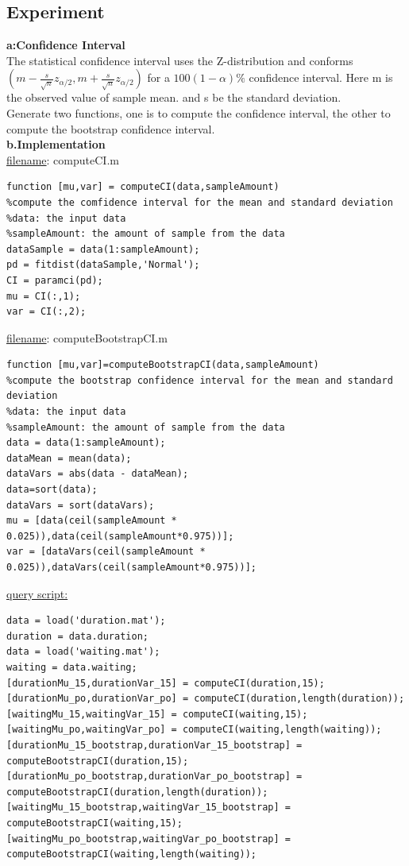 \documentclass[twoside]{article}
\begin{document}
\subsection{\normalsize{Experiment}}
\noindent \textbf {a:Confidence Interval}\\
The statistical confidence interval uses the Z-distribution and conforms $(m-\frac{s}{\sqrt{n}}z_{\alpha/2},m+\frac{s}{\sqrt{n}}z_{\alpha/2})$ for a $100(1-\alpha)\%$ confidence interval. Here m is the observed value of sample mean. and s be the standard deviation.\\
Generate two functions, one is to compute the confidence interval, the other to compute the bootstrap confidence interval. \\
\noindent \textbf {b.Implementation}\\
\underline{filename}: computeCI.m\\
\begin{lstlisting}
function [mu,var] = computeCI(data,sampleAmount)
%compute the comfidence interval for the mean and standard deviation
%data: the input data
%sampleAmount: the amount of sample from the data
dataSample = data(1:sampleAmount);
pd = fitdist(dataSample,'Normal');
CI = paramci(pd);
mu = CI(:,1);
var = CI(:,2);
\end{lstlisting}
\underline{filename}: computeBootstrapCI.m\\
\begin{lstlisting}
function [mu,var]=computeBootstrapCI(data,sampleAmount)
%compute the bootstrap confidence interval for the mean and standard deviation
%data: the input data
%sampleAmount: the amount of sample from the data
data = data(1:sampleAmount);
dataMean = mean(data);
dataVars = abs(data - dataMean);
data=sort(data);
dataVars = sort(dataVars);
mu = [data(ceil(sampleAmount * 0.025)),data(ceil(sampleAmount*0.975))];
var = [dataVars(ceil(sampleAmount * 0.025)),dataVars(ceil(sampleAmount*0.975))];   
\end{lstlisting}
\underline{query script: }\\
\begin{lstlisting}
data = load('duration.mat');
duration = data.duration;
data = load('waiting.mat');
waiting = data.waiting;
[durationMu_15,durationVar_15] = computeCI(duration,15);
[durationMu_po,durationVar_po] = computeCI(duration,length(duration));
[waitingMu_15,waitingVar_15] = computeCI(waiting,15);
[waitingMu_po,waitingVar_po] = computeCI(waiting,length(waiting));
[durationMu_15_bootstrap,durationVar_15_bootstrap] = computeBootstrapCI(duration,15);
[durationMu_po_bootstrap,durationVar_po_bootstrap] = computeBootstrapCI(duration,length(duration));
[waitingMu_15_bootstrap,waitingVar_15_bootstrap] = computeBootstrapCI(waiting,15);
[waitingMu_po_bootstrap,waitingVar_po_bootstrap] = computeBootstrapCI(waiting,length(waiting));
\end{lstlisting}
\end{document}
